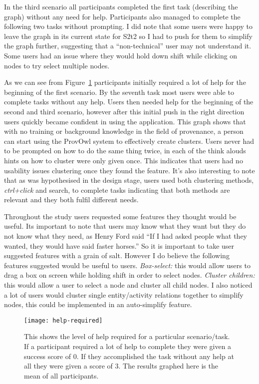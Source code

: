 In the third scenario all participants completed the first task (describing the graph) without any need for help. Participants also managed to complete the following two tasks without prompting. I did note that some users were happy to leave the graph in its current state for S2t2 so I had to push for them to simplify the graph further, suggesting that a ``non-technical'' user may not understand it. Some users had an issue where they would hold down shift while clicking on nodes to try select multiple nodes.

As we can see from Figure~\ref{fig:help-required} participants initially required a lot of help for the beginning of the first scenario. By the seventh task most users were able to complete tasks without any help. Users then needed help for the beginning of the second and third scenario, however after this initial push in the right direction users quickly became confident in using the application. This graph shows that with no training or background knowledge in the field of provenance, a person can start using the ProvOwl system to effectively create clusters. Users never had to be prompted on how to do the same thing twice, in each of the think alouds hints on how to cluster were only given once. This indicates that users had no usability issues clustering once they found the feature. It's also interesting to note that as was hypothesised in the design stage, users used both clustering methods, \textit{ctrl+click} and search, to complete tasks indicating that both methods are relevant and they both fulfil different needs. 

Throughout the study users requested some features they thought would be useful. Its important to note that users may know what they want but they do not know what they need, as Henry Ford said ``If I had asked people what they wanted, they would have said faster horses.'' So it is important to take user suggested features with a grain of salt. However I do believe the following features suggested would be useful to users.
\textit{Box-select:} this would allow users to drag a box on screen while holding shift in order to select nodes. \textit{Cluster children:} this would allow a user to select a node and cluster all child nodes. I also noticed a lot of users would cluster single entity/activity relations together to simplify nodes, this could be implemented in an auto-simplify feature.

\begin{figure}[h]
	\centering
	\texttt{[image: help-required]}
	\caption{This shows the level of help required for a particular scenario/task. If a participant required a lot of help to complete they were given a success score of 0. If they accomplished the task without any help at all they were given a score of 3. The results graphed here is the mean of all participants.}
	\label{fig:help-required}
\end{figure}

